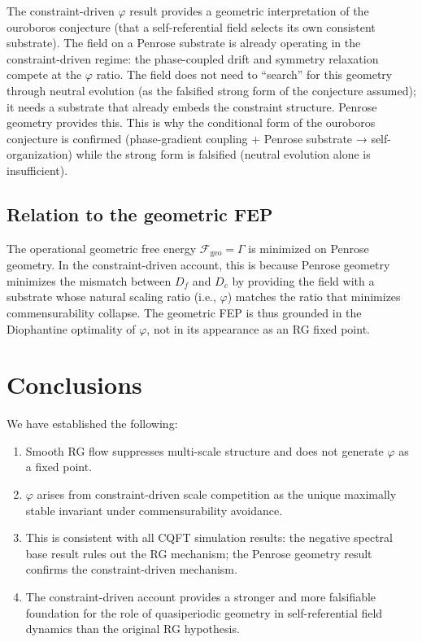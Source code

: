 \documentclass[11pt,a4paper]{article}
\theoremstyle{plain}
\theoremstyle{definition}
\newcommand{\phiGolden}{\varphi}
\begin{document}
The constraint-driven $\phiGolden$ result provides a geometric
interpretation of the ouroboros conjecture (that a self-referential
field selects its own consistent substrate). The field on a Penrose
substrate is already operating in the constraint-driven regime: the
phase-coupled drift and symmetry relaxation compete at the
$\phiGolden$ ratio. The field does not need to ``search'' for this
geometry through neutral evolution (as the falsified strong form of
the conjecture assumed); it needs a substrate that already embeds the
constraint structure. Penrose geometry provides this. This is why the
conditional form of the ouroboros conjecture is confirmed
(phase-gradient coupling + Penrose substrate → self-organization)
while the strong form is falsified (neutral evolution alone is
insufficient).

\subsection{Relation to the geometric FEP}

The operational geometric free energy $\mathcal{F}_{\text{geo}} = \Gamma$
is minimized on Penrose geometry. In the constraint-driven account, this
is because Penrose geometry minimizes the mismatch between $D_f$ and
$D_c$ by providing the field with a substrate whose natural scaling ratio
(i.e., $\phiGolden$) matches the ratio that minimizes commensurability
collapse. The geometric FEP is thus grounded in the Diophantine
optimality of $\phiGolden$, not in its appearance as an RG fixed point.

\section{Conclusions}
\label{sec:conclusions}

We have established the following:

\begin{enumerate}[noitemsep]
  \item Smooth RG flow suppresses multi-scale structure and does not
    generate $\phiGolden$ as a fixed point.
  \item $\phiGolden$ arises from constraint-driven scale competition as
    the unique maximally stable invariant under commensurability avoidance.
  \item This is consistent with all CQFT simulation results: the negative
    spectral base result rules out the RG mechanism; the Penrose geometry
    result confirms the constraint-driven mechanism.
  \item The constraint-driven account provides a stronger and more
    falsifiable foundation for the role of quasiperiodic geometry in
    self-referential field dynamics than the original RG hypothesis.
\end{enumerate}
\end{document}
